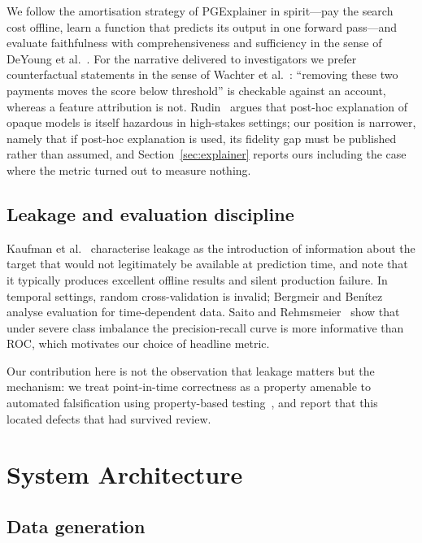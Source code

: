 \documentclass[conference]{IEEEtran}
\begin{document}
We follow the amortisation strategy of PGExplainer in spirit---pay the search
cost offline, learn a function that predicts its output in one forward
pass---and evaluate faithfulness with comprehensiveness and sufficiency in the
sense of DeYoung et al.~\cite{deyoung2020eraser}. For the narrative delivered to
investigators we prefer counterfactual statements in the sense of Wachter et
al.~\cite{wachter2017counterfactual}: ``removing these two payments moves the
score below threshold'' is checkable against an account, whereas a feature
attribution is not. Rudin~\cite{rudin2019stop} argues that post-hoc explanation
of opaque models is itself hazardous in high-stakes settings; our position is
narrower, namely that if post-hoc explanation is used, its fidelity gap must be
published rather than assumed, and Section~\ref{sec:explainer} reports ours
including the case where the metric turned out to measure nothing.

\subsection{Leakage and evaluation discipline}

Kaufman et al.~\cite{kaufman2012leakage} characterise leakage as the
introduction of information about the target that would not legitimately be
available at prediction time, and note that it typically produces excellent
offline results and silent production failure. In temporal settings, random
cross-validation is invalid; Bergmeir and Ben\'{i}tez~\cite{bergmeir2012cv}
analyse evaluation for time-dependent data. Saito and
Rehmsmeier~\cite{saito2015prauc} show that under severe class imbalance the
precision-recall curve is more informative than ROC, which motivates our choice
of headline metric.

Our contribution here is not the observation that leakage matters but the
mechanism: we treat point-in-time correctness as a property amenable to
automated falsification using property-based
testing~\cite{maciver2019hypothesis}, and report that this located defects that
had survived review.

\section{System Architecture}

\subsection{Data generation}
\end{document}
